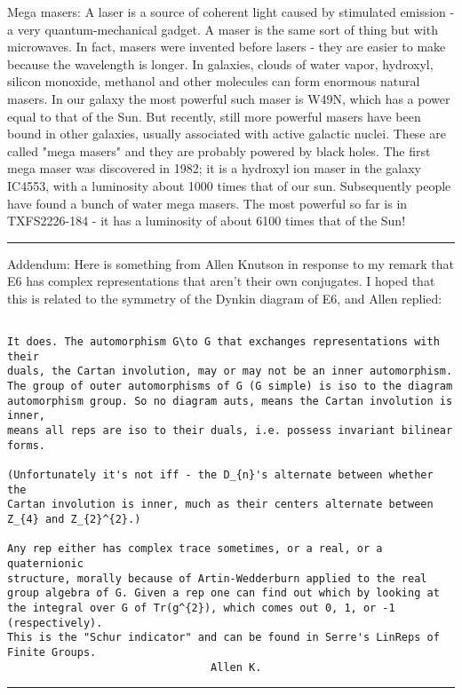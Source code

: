 Mega masers: A laser is a source of coherent light caused by stimulated
emission - a very quantum-mechanical gadget.  A maser is the same sort
of thing but with microwaves.  In fact, masers were invented before
lasers - they are easier to make because the wavelength is longer.  In
galaxies, clouds of water vapor, hydroxyl, silicon monoxide, methanol
and other molecules can form enormous natural masers.  In our galaxy the
most powerful such maser is W49N, which has a power equal to that of the
Sun.  But recently, still more powerful masers have been bound in other
galaxies, usually associated with active galactic nuclei.  These are
called "mega masers" and they are probably powered by black
holes.  The first mega maser was discovered in 1982; it is a hydroxyl
ion maser in the galaxy IC4553, with a luminosity about 1000 times that
of our sun.  Subsequently people have found a bunch of water mega
masers.  The most powerful so far is in TXFS2226-184 - it has a
luminosity of about 6100 times that of the Sun!

\par\noindent\rule{\textwidth}{0.4pt}
Addendum: Here is something from Allen Knutson in response to my remark
that E6 has complex representations that aren't their own conjugates.
I hoped that this is related to the symmetry of the Dynkin diagram
of E6, and Allen replied:


\begin{verbatim}

It does. The automorphism G\to G that exchanges representations with their
duals, the Cartan involution, may or may not be an inner automorphism.
The group of outer automorphisms of G (G simple) is iso to the diagram
automorphism group. So no diagram auts, means the Cartan involution is inner,
means all reps are iso to their duals, i.e. possess invariant bilinear forms.

(Unfortunately it's not iff - the D_{n}'s alternate between whether the
Cartan involution is inner, much as their centers alternate between
Z_{4} and Z_{2}^{2}.)

Any rep either has complex trace sometimes, or a real, or a quaternionic
structure, morally because of Artin-Wedderburn applied to the real
group algebra of G. Given a rep one can find out which by looking at
the integral over G of Tr(g^{2}), which comes out 0, 1, or -1 (respectively).  
This is the "Schur indicator" and can be found in Serre's LinReps of 
Finite Groups.
								Allen K.
\end{verbatim}
    





\par\noindent\rule{\textwidth}{0.4pt}
